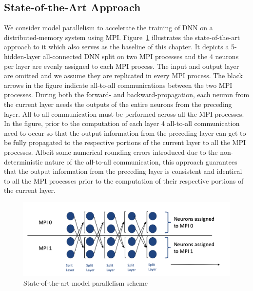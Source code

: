 \subsection{State-of-the-Art Approach}
We consider model parallelism to accelerate the training of DNN on a
distributed-memory system using MPI. Figure~\ref{fig:altsplit_baseline}
illustrates the state-of-the-art approach to it which also serves as the baseline of
this chapter. It depicts a 5-hidden-layer all-connected DNN split on two MPI
processes and the 4 neurons per layer are evenly assigned to each MPI
process. The input and output layer are omitted and we assume they are
replicated in every MPI process. The black arrows in the figure indicate
all-to-all communications between the two MPI processes. During both the
forward- and backward-propagation, each neuron from the current layer needs
the outputs of the entire neurons from the preceding layer. All-to-all
communication must be performed across all the MPI processes. In the figure,
prior to the computation of each layer 4 all-to-all communication need to
occur so that the output information from the preceding layer can get to be
fully propagated to the respective portions of the current layer to all the
MPI processes. Albeit some numerical rounding errors introduced due to the
non-deterministic nature of the all-to-all communication, this approach
guarantees that the output information from the preceding layer is consistent
and identical to all the MPI processes prior to the computation of their
respective portions of the current layer.
\begin{figure}[H]
    \centerline{\includegraphics[scale=0.60]{altsplit/figs/baseline.png}}
    \caption{State-of-the-art model parallelism scheme}
    \label{fig:altsplit_baseline}
\end{figure}

